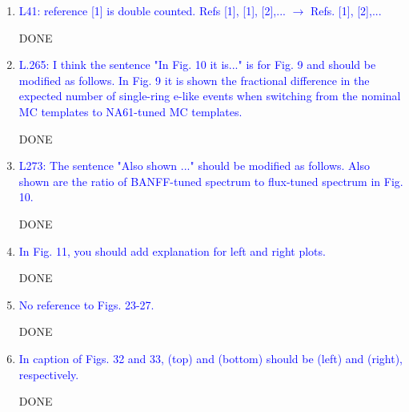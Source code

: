 \documentclass[final]{elsarticle}
\begin{document}
\begin{enumerate}

\item 

\textcolor{blue}
{L41: reference [1] is double counted. Refs [1], [1], [2],... $\to$ Refs. [1], [2],...}

DONE

\item

\textcolor{blue}
{L.265: 
I think the sentence "In Fig. 10 it is..." is for Fig. 9 and should be modified as follows.
In Fig. 9 it is shown the fractional difference in the expected number of single-ring e-like events
when switching from the nominal MC templates to NA61-tuned MC templates.}

DONE

\item

\textcolor{blue}
{L273: The sentence "Also shown ..." should be modified as follows.
Also shown are the ratio of BANFF-tuned spectrum to flux-tuned spectrum in Fig. 10.}

DONE


\item

\textcolor{blue}
{In Fig. 11, you should add explanation for left and right plots.}

DONE



\item 

\textcolor{blue}
{No reference to Figs. 23-27.}

DONE


\item

\textcolor{blue}
{In caption of Figs. 32 and 33, (top) and (bottom) should be (left) and (right), respectively.}

DONE

\end{enumerate}
\end{document}
